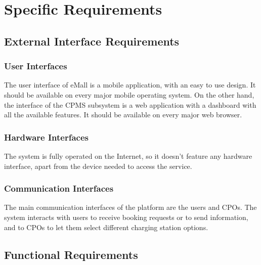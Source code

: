 \section{Specific Requirements}
\subsection{External Interface Requirements}
\subsubsection{User Interfaces}
The user interface of eMall is a mobile application, with an easy to use design.
It should be available on every major mobile operating system.
On the other hand, the interface of the CPMS subsystem is a web application with a dashboard with all the available features.
It should be available on every major web browser.
\subsubsection{Hardware Interfaces}
The system is fully operated on the Internet, so it doesn't feature any hardware interface, apart from the device needed to access the service.
\subsubsection{Communication Interfaces}
The main communication interfaces of the platform are the users and CPOs.
The system interacts with users to receive booking requests or to send information, and to CPOs to let them select different charging station options.
\newpage
\subsection{Functional Requirements}

